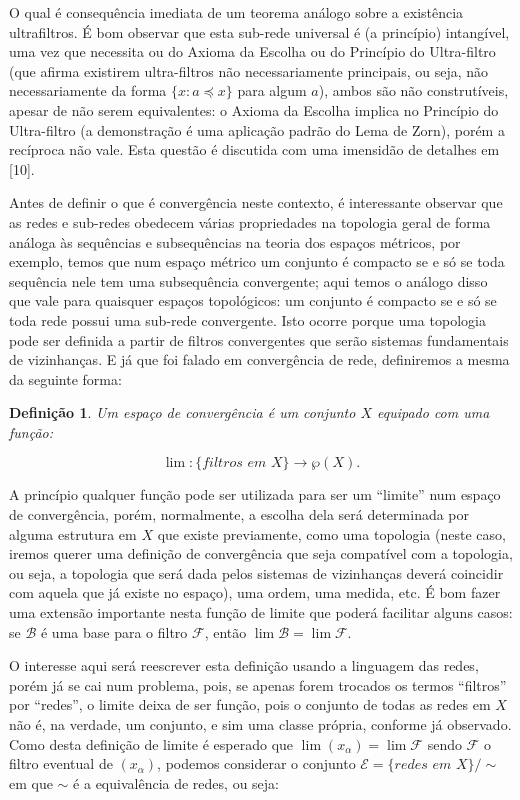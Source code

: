 \documentclass[12pt, a4paper]{article}
\newtheorem{mydef}{Definição}[section]
\theoremstyle{definition}
\begin{document}
O qual é consequência imediata de um teorema análogo sobre a existência ultrafiltros. É bom observar que esta sub-rede universal é (a princípio) intangível, uma vez que necessita ou do Axioma da Escolha ou do Princípio do Ultra-filtro (que afirma existirem ultra-filtros não necessariamente principais, ou seja, não necessariamente da forma $\{x: a\preceq x\}$ para algum $a$), ambos são não construtíveis, apesar de não serem equivalentes: o Axioma da Escolha implica no Princípio do Ultra-filtro (a demonstração é uma aplicação padrão do Lema de Zorn), porém a recíproca não vale. Esta questão é discutida com uma imensidão de detalhes em [10]. 

Antes de definir o que é convergência neste contexto, é interessante observar que as redes e sub-redes obedecem várias propriedades na topologia geral de forma análoga às sequências e subsequências na teoria dos espaços métricos, por exemplo, temos que num espaço métrico um conjunto é compacto se e só se toda sequência nele tem uma subsequência convergente; aqui temos o análogo disso que vale para quaisquer espaços topológicos: um conjunto é compacto se e só se toda rede possui uma sub-rede convergente. Isto ocorre porque uma topologia pode ser definida a partir de filtros convergentes que serão sistemas fundamentais de vizinhanças. E já que foi falado em convergência de rede, definiremos a mesma da seguinte forma: 

\begin{mydef}

Um espaço de convergência é um conjunto $X$ equipado com uma função: 

$$\lim : \{\textit{filtros em } X\}\rightarrow \wp (X).$$	
	
\end{mydef}
  
A princípio qualquer função pode ser utilizada para ser um ``limite'' num espaço de convergência, porém, normalmente, a escolha dela será determinada por alguma estrutura em $X$ que existe previamente, como uma topologia (neste caso, iremos querer uma definição de convergência que seja compatível com a topologia, ou seja, a topologia que será dada pelos sistemas de vizinhanças deverá coincidir com aquela que já existe no espaço), uma ordem, uma medida, etc. É bom fazer uma extensão importante nesta função de limite que poderá facilitar alguns casos: se $\mathcal{B}$ é uma base para o filtro  $\mathcal{F}$, então $\lim \mathcal{B}=\lim \mathcal{F}$. 

O interesse aqui será reescrever esta definição usando a linguagem das redes, porém já se cai num problema, pois, se apenas forem trocados os termos ``filtros'' por ``redes'', o limite deixa de ser função, pois o conjunto de todas as redes em $X$ não é, na verdade, um conjunto, e sim uma classe própria, conforme já observado. Como desta definição de limite é esperado que $\lim (x_\alpha)=\lim \mathcal{F}$ sendo $\mathcal{F}$ o filtro eventual de $(x_\alpha)$, podemos considerar o conjunto $\mathcal{E} = \{\textit{{redes em }} X\} / \sim$ em que $\sim$ é a equivalência de redes, ou seja:
\end{document}
